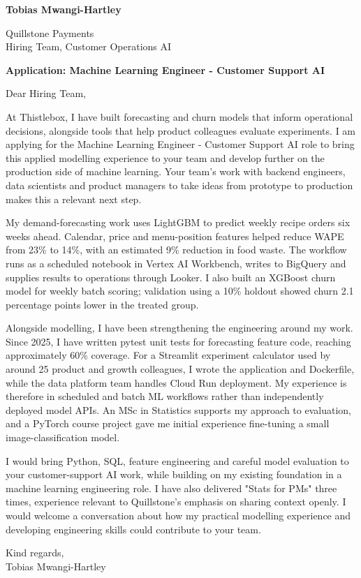 \documentclass[11pt,a4paper]{article}
\begin{document}
\textbf{\color{primarycolor} Tobias Mwangi-Hartley}

Quillstone Payments\\
Hiring Team, Customer Operations AI

\textbf{Application: Machine Learning Engineer - Customer Support AI}

Dear Hiring Team,

At Thistlebox, I have built forecasting and churn models that inform operational decisions, alongside tools that help product colleagues evaluate experiments. I am applying for the Machine Learning Engineer - Customer Support AI role to bring this applied modelling experience to your team and develop further on the production side of machine learning. Your team's work with backend engineers, data scientists and product managers to take ideas from prototype to production makes this a relevant next step.

My demand-forecasting work uses LightGBM to predict weekly recipe orders six weeks ahead. Calendar, price and menu-position features helped reduce WAPE from 23\% to 14\%, with an estimated 9\% reduction in food waste. The workflow runs as a scheduled notebook in Vertex AI Workbench, writes to BigQuery and supplies results to operations through Looker. I also built an XGBoost churn model for weekly batch scoring; validation using a 10\% holdout showed churn 2.1 percentage points lower in the treated group.

Alongside modelling, I have been strengthening the engineering around my work. Since 2025, I have written pytest unit tests for forecasting feature code, reaching approximately 60\% coverage. For a Streamlit experiment calculator used by around 25 product and growth colleagues, I wrote the application and Dockerfile, while the data platform team handles Cloud Run deployment. My experience is therefore in scheduled and batch ML workflows rather than independently deployed model APIs. An MSc in Statistics supports my approach to evaluation, and a PyTorch course project gave me initial experience fine-tuning a small image-classification model.

I would bring Python, SQL, feature engineering and careful model evaluation to your customer-support AI work, while building on my existing foundation in a machine learning engineering role. I have also delivered "Stats for PMs" three times, experience relevant to Quillstone's emphasis on sharing context openly. I would welcome a conversation about how my practical modelling experience and developing engineering skills could contribute to your team.

Kind regards,\\
Tobias Mwangi-Hartley
\end{document}
